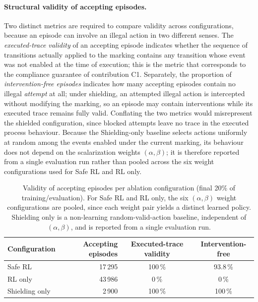 \paragraph{Structural validity of accepting episodes.}
Two distinct metrics are required to compare validity across
configurations, because an episode can involve an illegal action in two
different senses. The \emph{executed-trace validity} of an accepting
episode indicates whether the sequence of transitions actually applied
to the marking contains any transition whose event was not enabled at
the time of execution; this is the metric that corresponds to the
compliance guarantee of contribution C1. Separately, the proportion of
\emph{intervention-free episodes} indicates how many accepting episodes
contain no illegal \emph{attempt} at all; under shielding, an attempted
illegal action is intercepted without modifying the marking, so an
episode may contain interventions while its executed trace remains
fully valid. Conflating the two metrics would misrepresent the shielded
configuration, since blocked attempts leave no trace in the executed
process behaviour. Because the Shielding-only baseline selects
actions uniformly at random among the events enabled under the current
marking, its behaviour does not depend on the scalarization weights
$(\alpha,\beta)$; it is therefore reported from a single evaluation run
rather than pooled across the six weight configurations used for Safe
RL and RL only.

\begin{table}[H]
\centering
\caption{Validity of accepting episodes per ablation configuration (final 20\% of training/evaluation). For Safe RL and RL only, the six $(\alpha,\beta)$ weight configurations are pooled, since each weight pair yields a distinct learned policy. Shielding only is a non-learning random-valid-action baseline, independent of $(\alpha,\beta)$, and is reported from a single evaluation run.}
\label{tab:ablation_validity}
\begin{tabular}{lrcc}
\toprule
\textbf{Configuration} & \textbf{Accepting episodes} &
\textbf{Executed-trace validity} & \textbf{Intervention-free} \\
\midrule
Safe \ac{RL}    & 17\,295 & 100\,\% & 93.8\,\% \\
\ac{RL} only    & 43\,986 & 0\,\%   & 0\,\%    \\
Shielding only  & 2\,900  & 100\,\% & 100\,\%  \\
\bottomrule
\end{tabular}
\end{table}

